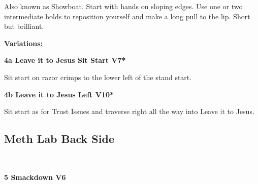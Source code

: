 \begin{multicols}{2}
\begin{minipage}{\linewidth}
					\begin{adjustwidth}{0.5cm}{}				
					Also known as Showboat. Start with hands on sloping edges. Use one or two intermediate holds to reposition yourself and make a long pull to the lip. Short but brilliant.
					\end{adjustwidth}
					\end{minipage}
						\begin{adjustwidth}{0.5cm}{}				
						\textbf{Variations:} \newline
							\begin{minipage}{\linewidth}	
							\label{vr:Leave it to Jesus Sit Start}
\colorbox{Goldenrod!50}{
\parbox{0.95\textwidth}{
\textbf{
4a Leave it to Jesus Sit Start V7*  
}
}
}

							\begin{adjustwidth}{0.5cm}{}				
							Sit start on razor crimps to the lower left of the stand start.
							\end{adjustwidth}
							\end{minipage}
							\begin{minipage}{\linewidth}	
							\label{vr:Leave it to Jesus Left}
\colorbox{red!20}{
\parbox{0.95\textwidth}{
\textbf{
4b Leave it to Jesus Left V10*  
}
}
}

							\begin{adjustwidth}{0.5cm}{}				
							Sit start as for Trust Issues and traverse right all the way into Leave it to Jesus.
							\end{adjustwidth}
							\end{minipage}
						\end{adjustwidth}

			\begin{minipage}{\columnwidth}
			\subsection*{Meth Lab Back Side}\label{bf:Meth Lab Back Side}
			\
			
\label{pt:Octernal}
			\end{minipage}
			
					\begin{minipage}{\linewidth}	
					\label{rt:Smackdown}
\colorbox{RoyalBlue!20}{
\parbox{0.95\textwidth}{
\textbf{
5 Smackdown V6    
}
}
}


\end{minipage}
\end{multicols}
